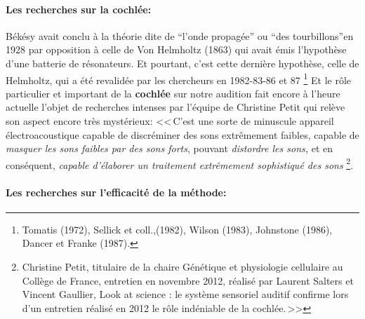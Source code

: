 {\begin{quotation}
\end{quotation}

\paragraph{Les recherches sur la cochlée:}
Békésy avait conclu à la théorie dite de ``l'onde propagée'' ou ``des
tourbillons''en 1928 par opposition à celle de Von
Helmholtz (1863) qui avait émis l'hypothèse d'une batterie de
résonateurs. Et pourtant, c'est cette dernière hypothèse, celle de
Helmholtz, qui a été revalidée par les chercheurs en 1982-83-86 et 87
\footnote{ Tomatis (1972), Sellick et coll.,(1982), Wilson (1983),
  Johnstone (1986), Dancer et
Franke (1987).}
 Et le rôle particulier et important de la \textbf{cochlée} sur notre audition fait encore à l'heure
actuelle l'objet de recherches intenses
par l'équipe de Christine Petit qui relève
son aspect encore très mystérieux:
<<\,C'est une sorte de minuscule appareil électroacoustique capable
de discréminer des sons extrêmement faibles, capable de \emph{masquer
les sons faibles par des sons forts}, pouvant \emph{distordre les
sons,} et en conséquent, \emph{capable d'élaborer un traitement extrêmement
sophistiqué des sons}%
\footnote{Christine Petit, titulaire de la chaire Génétique et
physiologie cellulaire au Collège de France, entretien en novembre 2012, 
réalisé par Laurent Salters et Vincent Gaullier, 
Look at science : le système sensoriel auditif confirme 
lors d'un entretien réalisé en 2012 le rôle indéniable de la cochlée.\,>>}.

\paragraph{Les recherches sur l'efficacité de la méthode:}

}
